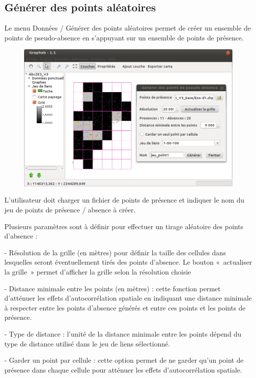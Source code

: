 \documentclass{article}
\begin{document}
\subsection{Générer des points aléatoires}

Le menu Données / Générer des points aléatoires permet de créer un ensemble de points de pseudo-absence en s’appuyant sur un ensemble de points de présence.

\begin{figure}[H]
	\includegraphics[scale=0.5]{img/manual-fr_img14.png} 
\end{figure}

L’utilisateur doit charger un fichier de points de présence et indiquer le nom du jeu de points de présence / absence à créer.

Plusieurs paramètres sont à définir pour effectuer un tirage aléatoire des points d’absence :

{}- Résolution de la grille (en mètres) pour définir la taille des cellules dans lesquelles seront éventuellement tirés des points d’absence. Le bouton «~actualiser la grille~» permet d’afficher la grille selon la résolution choisie

{}- Distance minimale entre les points (en mètres) : cette fonction permet d’atténuer les effets d’autocorrélation spatiale en indiquant une distance minimale à respecter entre les points d’absence générés et entre ces points et les points de présence. 

{}- Type de distance : l’unité de la distance minimale entre les points dépend du type de distance utilisé dans le jeu de liens sélectionné.

{}- Garder un point par cellule : cette option permet de ne garder qu’un point de présence dans chaque cellule pour atténuer les effets d’autocorrélation spatiale.
\end{document}
